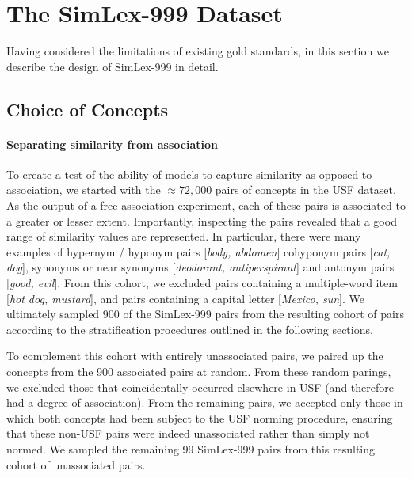 \section{The SimLex-999 Dataset} 

Having considered the limitations of existing gold standards, in this section we describe the design of SimLex-999 in detail. 

\subsection{Choice of Concepts}

\paragraph{Separating similarity from association}To create a test of the ability of models to capture similarity as opposed to association, we started with the \(\approx 72,000\) pairs of concepts in the USF dataset. As the output of a free-association experiment, each of these pairs is associated to a greater or lesser extent. Importantly, inspecting the pairs revealed that a good range of similarity values are represented. In particular, there were many examples of hypernym / hyponym pairs [\emph{body, abdomen}] cohyponym pairs [\emph{cat, dog}], synonyms or near synonyms [\emph{deodorant, antiperspirant}] and antonym pairs [\emph{good, evil}]. From this cohort, we excluded pairs containing a multiple-word item [\emph{hot dog, mustard}], and pairs containing a capital letter [\emph{Mexico, sun}]. We ultimately sampled 900 of the SimLex-999 pairs from the resulting cohort of pairs according to the stratification procedures outlined in the following sections. 


To complement this cohort with entirely unassociated pairs, we paired up the concepts from the 900 associated pairs at random. From these random parings, we excluded those that coincidentally occurred elsewhere in USF (and therefore had a degree of association). From the remaining pairs, we accepted only those in which both concepts had been subject to the USF norming procedure, ensuring that these non-USF pairs were indeed unassociated rather than simply not normed. We sampled the remaining 99 SimLex-999 pairs from this resulting cohort of unassociated pairs.  

